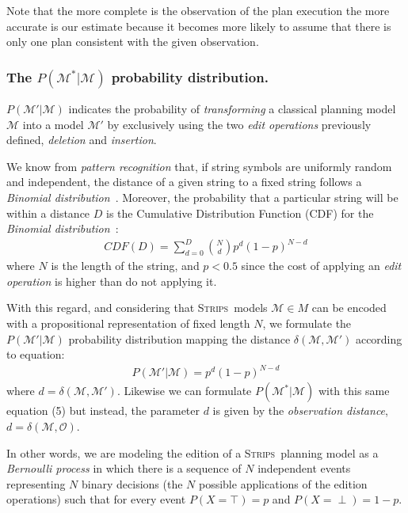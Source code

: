 \documentclass[letterpaper]{article} %
\newcommand{\strips}{\textsc{Strips}}     %
\begin{document}
Note that the more complete is the observation of the plan execution the more accurate is our estimate because it becomes more likely to assume that there is only one plan consistent with the given observation.

\subsubsection{The $P(\mathcal{M^*}|\mathcal{M})$ probability distribution.} $P(\mathcal{M'}|\mathcal{M})$ indicates the probability of {\em transforming} a classical planning model $\mathcal{M}$ into a model $\mathcal{M'}$ by exclusively using the two {\em edit operations} previously defined, {\em deletion} and {\em insertion}.

We know from {\em pattern recognition} that, if string symbols are uniformly random and independent, the distance of a given string to a fixed string follows a {\em Binomial distribution}~\cite{}. Moreover, the probability that a particular string will be within a distance $D$ is the Cumulative Distribution Function (CDF) for the {\em Binomial distribution}~\cite{wilcox1981review}:
\begin{align}
CDF(D)=\sum_{d=0}^D{{N}\choose{d}}  p^d (1-p)^{N-d}
\end{align}
where $N$ is the length of the string, and $p<0.5$ since the cost of applying an {\em edit operation} is higher than do not applying it.

With this regard, and considering that \strips\ models $\mathcal{M}\in M$ can be encoded with a propositional representation of fixed length $N$, we formulate the $P(\mathcal{M'}|\mathcal{M})$ probability distribution mapping the distance $\delta(\mathcal{M},\mathcal{M'})$ according to equation:
\begin{align}
P(\mathcal{M'}|\mathcal{M}) = p^d  (1-p)^{N-d}
\end{align}
where $d=\delta(\mathcal{M},\mathcal{M}')$. Likewise we can formulate $P(\mathcal{M^*}|\mathcal{M})$ with this same equation (5) but instead, the parameter $d$ is given by the {\em observation distance}, $d=\delta(\mathcal{M},\mathcal{O})$.

In other words, we are modeling the edition of a \strips\ planning model as a {\em Bernoulli process} in which there is a sequence of $N$ independent events representing $N$ binary decisions (the $N$ possible applications of the edition operations) such that for every event $P(X=\top)=p$ and $P(X=\perp)=1-p$.
\end{document}
